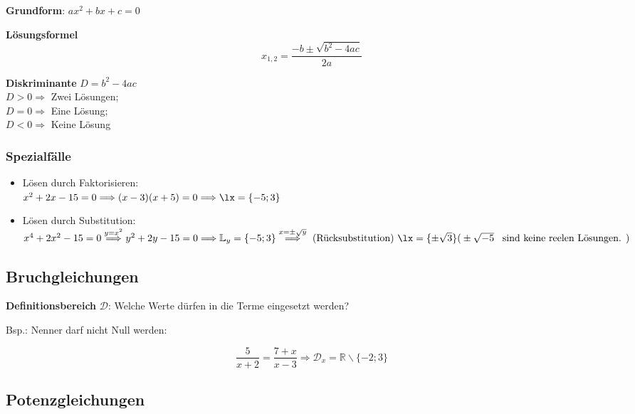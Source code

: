 \begin{multicols}{2}
\textbf{Grundform}: $ax^2 + bx+c = 0$

\begin{tcolorbox}[colback=white]
  \textbf{Lösungsformel}
  $$x_{1,2} = \frac{-b \pm \sqrt{b^2-4ac}}{2a}$$
\end{tcolorbox}
\textbf{Diskriminante} $D = b^2-4ac$\\
$D>0\Longrightarrow$ Zwei Lösungen;\\
$D=0\Longrightarrow$ Eine Lösung;\\
$D<0\Longrightarrow$ Keine Lösung

\subsubsection*{Spezialfälle}
\begin{itemize}
\item Lösen durch Faktorisieren:\\
$x^2+2x-15=0 \Longrightarrow (x-3)(x+5)=0 \Longrightarrow \lx=\{-5; 3\}$ %

\item Lösen durch Substitution:\\
$x^4+2x^2-15=0 \stackrel{y=x^2}{\Longrightarrow}\\
y^2+2y-15=0 \Longrightarrow \mathbb{L}_y=\{-5;3\} \stackrel{x=\pm{}\sqrt{y}}{\Longrightarrow}
\textrm{ (Rücksubstitution) } \lx=\{\pm\sqrt{3}\}\\
\textrm{(} \pm\sqrt{-5} \textrm{ \, sind keine reelen Lösungen. )}$

\end{itemize}

\subsection*{Bruchgleichungen}

\textbf{Definitionsbereich} $\mathcal{D}$: Welche Werte dürfen in die Terme eingesetzt werden?

Bsp.: Nenner darf nicht Null werden:

$$\frac5{x+2}=\frac{7+x}{x-3} \Rightarrow{} \mathcal{D}_x=\mathbb{R}\backslash{}\{-2; 3\}$$

\subsection*{Potenzgleichungen}



\end{multicols}

